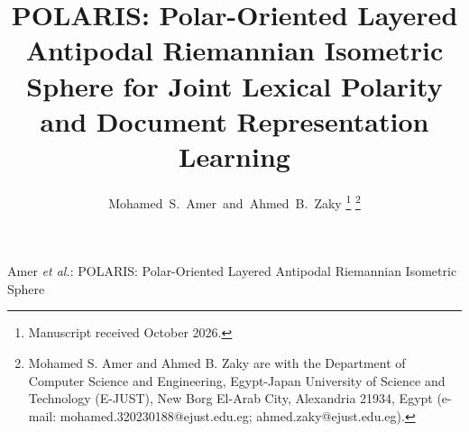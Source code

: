 \documentclass[journal]{IEEEtran}
\begin{document}
\title{POLARIS: Polar-Oriented Layered Antipodal Riemannian Isometric Sphere for Joint Lexical Polarity and Document Representation Learning}

\author{Mohamed~S.~Amer~and~Ahmed~B.~Zaky%
\thanks{Manuscript received October 2026.}%
\thanks{Mohamed S. Amer and Ahmed B. Zaky are with the Department of Computer Science and Engineering, Egypt-Japan University of Science and Technology (E-JUST), New Borg El-Arab City, Alexandria 21934, Egypt (e-mail: mohamed.320230188@ejust.edu.eg; ahmed.zaky@ejust.edu.eg).}}

%
{Amer \MakeLowercase{\textit{et al.}}: POLARIS: Polar-Oriented Layered Antipodal Riemannian Isometric Sphere}

\maketitle
\end{document}
